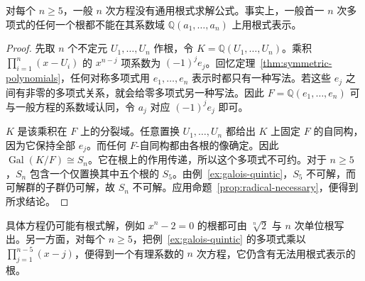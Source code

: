 \documentclass[lang=cn,a4paper,fontset=none,zihao=false,10pt,openany,twoside]{beautybook}
\numberwithin{algorithm}{chapter}
\begin{document}
\begin{theorem}\label{thm:abel-ruffini}
对每个 $n\ge5$，一般 $n$ 次方程没有通用根式求解公式。事实上，一般首一 $n$ 次多项式的任何一个根都不能在其系数域 $\mathbb Q(a_1,\dots,a_n)$ 上用根式表示。
\end{theorem}
\begin{proof}
先取 $n$ 个不定元 $U_1,\dots,U_n$ 作根，令 $K=\mathbb Q(U_1,\dots,U_n)$。乘积 $\prod_{i=1}^n(x-U_i)$ 的 $x^{n-j}$ 项系数为 $(-1)^j e_j$。回忆定理~\ref{thm:symmetric-polynomials}，任何对称多项式用 $e_1,\dots,e_n$ 表示时都只有一种写法。若这些 $e_j$ 之间有非零的多项式关系，就会给零多项式另一种写法。因此 $F=\mathbb Q(e_1,\dots,e_n)$ 可与一般方程的系数域认同，令 $a_j$ 对应 $(-1)^je_j$ 即可。

$K$ 是该乘积在 $F$ 上的分裂域。任意置换 $U_1,\dots,U_n$ 都给出 $K$ 上固定 $F$ 的自同构，因为它保持全部 $e_j$。而任何 $F$-自同构都由各根的像确定。因此 $\operatorname{Gal}(K/F)\cong S_n$。它在根上的作用传递，所以这个多项式不可约。对于 $n\ge5$，$S_n$ 包含一个仅置换其中五个根的 $S_5$。由例~\ref{ex:galois-quintic}，$S_5$ 不可解，而可解群的子群仍可解，故 $S_n$ 不可解。应用命题~\ref{prop:radical-necessary}，便得到所求结论。
\end{proof}

具体方程仍可能有根式解，例如 $x^n-2=0$ 的根都可由 $\sqrt[n]{2}$ 与 $n$ 次单位根写出。另一方面，对每个 $n\ge5$，把例~\ref{ex:galois-quintic} 的多项式乘以 $\prod_{j=1}^{n-5}(x-j)$，便得到一个有理系数的 $n$ 次方程，它仍含有无法用根式表示的根。

\FloatBarrier
\end{document}
